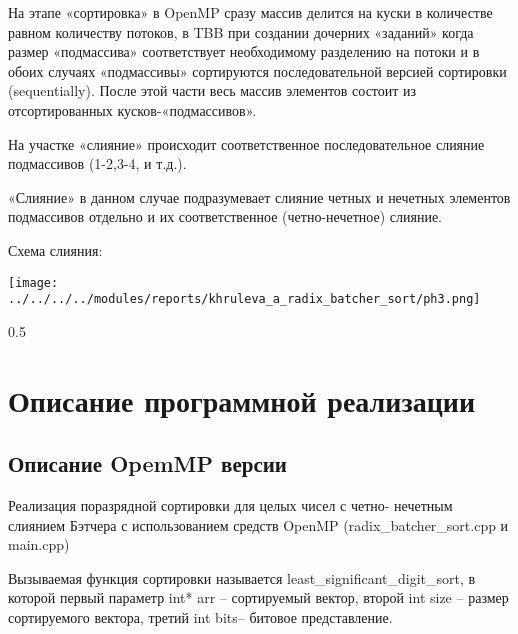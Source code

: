\documentclass[a4paper,final]{report}
\begin{document}
\begin{spacing}{1.5}
		\vspace{2ex}
        
		\par На этапе «сортировка» в OpenMP сразу массив делится на куски в количестве равном количеству потоков, в TBB при создании дочерних «заданий» когда размер «подмассива» соответствует необходимому разделению на потоки и в обоих случаях «подмассивы» сортируются последовательной версией сортировки (sequentially). После этой части весь массив элементов состоит из отсортированных кусков-«подмассивов».  
		\par На участке «слияние» происходит соответственное последовательное слияние подмассивов (1-2,3-4, и т.д.).   
		\par «Слияние» в данном случае подразумевает слияние четных и нечетных элементов подмассивов отдельно и их соответственное (четно-нечетное) слияние. 
		
		\par Схема слияния: 
			\vspace{2ex}
        
		\begin{center}
        \texttt{[image: ../../../../modules/reports/khruleva\_a\_radix\_batcher\_sort/ph3.png]}
        \end{center}
        
		\vspace{2ex}
		
		\newpage
		\begin{spacing} {0.5}
			\section{Описание программной реализации}
		\end{spacing}
		\subsection{Описание OpemMP версии}
		
		\par  Реализация поразрядной сортировки для целых чисел с четно- нечетным слиянием Бэтчера с использованием средств OpenMP (radix\_batcher\_sort.cpp и main.cpp) 
		\par  Вызываемая функция сортировки называется  least\_significant\_digit\_sort, в которой первый параметр int* arr – сортируемый вектор, второй int size – размер сортируемого вектора, третий  int bits– битовое представление. 
		\begin{spacing}{0}
\end{spacing}


\end{spacing}
\end{document}
